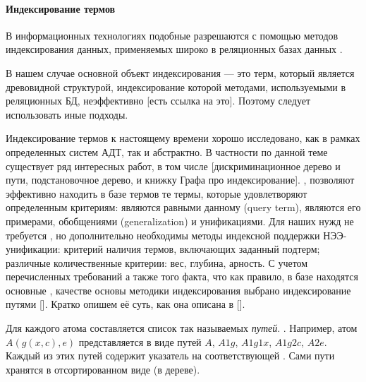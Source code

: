 \paragraph{Индексирование термов}

В информационных технологиях подобные  разрешаются с помощью методов индексирования данных, применяемых широко в реляционных базах данных \cite{Ulman}. 

В нашем случае основной объект индексирования --- это терм, который является древовидной структурой, индексирование которой методами, используемыми в  реляционных БД, неэффективно [есть ссылка на это]. Поэтому следует использовать иные подходы. 

Индексирование термов к настоящему времени хорошо исследовано, как в рамках определенных систем АДТ, так и абстрактно. В частности по данной теме существует ряд интересных работ, в том числе [дискриминационное дерево и пути, подстановочное дерево, и книжку Графа про индексирование]. , позволяют эффективно находить в базе термов те термы, которые удовлетворяют определенным критериям: являются равными данному (query term), являются его примерами, обобщениями (generalization) и унификациями. Для наших нужд не требуется , но дополнительно необходимы методы индексной поддержки НЭЭ-унификации: критерий наличия термов, включающих заданный подтерм; различные количественные критерии: вес, глубина, арность. С учетом перечисленных требований а также того факта, что как правило, в базе находятся основные , качестве основы методики индексирования выбрано индексирование путями []. Кратко опишем её суть, как она описана в [].

Для каждого атома составляется список так называемых \emph{путей}. \rem{...}{Надо привести формальное определение пути из [макКьюн]]}. Например, атом $A(g(x,c),e)$ представляется в виде путей $A$, $A1g$, $A1g1x$, $A1g2c$, $A2e$. Каждый из этих путей содержит указатель на соответствующей . Сами пути хранятся в отсортированном виде (в дереве).


